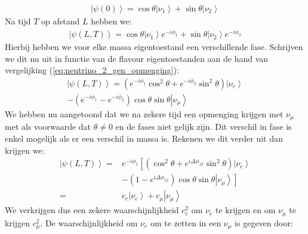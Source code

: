 \documentclass[../main.tex]{subfiles}
\begin{document}
\begin{equation}
    \begin{aligned}
        \label{eq:neutrino_2_oscilaties_1}
        \left|\psi(0)\right>=\cos \theta\left| \nu_{1}\right>+\sin \theta \left| \nu_{2}\right>
    \end{aligned}
\end{equation}
Na tijd $T$ op afstand $L$ hebben we:
\begin{equation}
    \begin{aligned}
        \label{eq:neutrino_2_oscilaties_2}
        \left|\psi(L, T)\right>=\cos \theta\left| \nu_{1}\right>e^{-i \phi_{1}}+\sin \theta \left| \nu_{2}\right>e^{-i \phi_{2}}
    \end{aligned}
\end{equation}
Hierbij hebben we voor elke massa eigentoestand een verschillende fase. Schrijven we dit nu uit in functie van de flavour eigentoestanden aan de hand van vergelijking (\ref{eq:neutrino_2_gen_opmenging}):
\begin{equation}
    \begin{aligned}
        \label{eq:neutrino_2_oscilaties_3}
        \left|\psi(L, T)\right>=\left(e^{-i \phi_{1}} \cos ^{2} \theta+e^{-i \phi_{2}} \sin ^{2} \theta\right)\left| \nu_{e}\right>\\
        -\left(e^{-i \phi_{1}}-e^{-i \phi_{2}}\right) \cos \theta \sin \theta \left| \nu_{\mu}\right>
    \end{aligned}
\end{equation}
We hebben nu aangetoond dat we na zekere tijd een opmenging krijgen met $\nu_\mu$ met als voorwaarde dat $\theta\neq 0$ en de fases niet gelijk zijn. Dit verschil in fase is enkel mogelijk als er een verschil in massa is. Rekenen we dit verder uit dan krijgen we:
\begin{equation}
    \begin{aligned}
        \label{eq:neutrino_2_oscilaties_4}
        \left|\psi(L, T)\right>=& e^{-i \phi_{1}}\left[\left(\cos ^{2} \theta+e^{i \Delta \phi_{12}} \sin ^{2} \theta\right)\left|\nu_{e}\right>\right.\\
                                &\left.-\left(1-e^{i \Delta \phi_{12}}\right) \cos \theta \sin \theta\left|\nu_{\mu}\right>\right] \\
        =& c_{e}\left|\nu_{e}\right>+c_{\mu}\left| \nu_{\mu}\right>
    \end{aligned}
\end{equation}
We verkrijgen dus een zekere waarschijnlijkheid $c_e^2$ om $\nu_e$ te krijgen en om $\nu_\mu$ te krijgen $c_\mu^2$. De waarschijnlijkheid om $\nu_e$ om te zetten in een $\nu_\mu$ is gegeven door:
\end{document}
